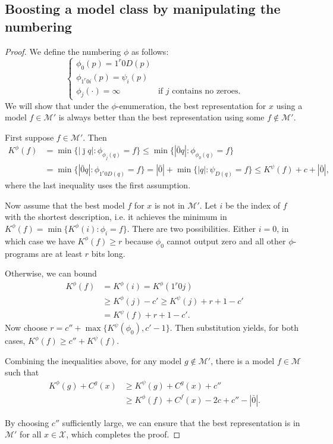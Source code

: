 \documentclass{style/llncs}
\newcommand{\M}{\mathscr M}
\newcommand{\X}{\mathscr X}
\begin{document}
\subsection{Boosting a model class by manipulating the numbering}

\coolone*

\begin{proof}
We define the numbering $\phi$ as follows:
\[\begin{cases}
\phi_0(p) = 1^r 0 D(p) \\
\phi_{1^r0i}(p) = \psi_i(p) \\
\phi_j(\cdot) = \infty &\text{if $j$ contains no zeroes.}
\end{cases}\]
We will show that under the $\phi$-enumeration, the best representation for $x$ using a model $f\in\M'$ is always better than the best representation using some $f\not\in\M'$.

First suppose $f\in\M'$. Then
\begin{align*}
K^\phi(f) &=\min\{|\bar\jmath q|:\phi_{\phi_j(q)}=f\}
\leq\min\{|\bar0 q|:\phi_{\phi_0(q)}=f\} \\ 
&=\min\{|\bar0 q|:\phi_{1^r0 D(q)}=f\}  
=|\bar 0|+\min\{|q|:\psi_{D(q)}=f\}
\leq K^\psi(f)+c+|\bar 0|,
\end{align*}
where the last inequality uses the first assumption.

Now assume that the best model $f$ for $x$ is not in $\M'$. 
Let $i$ be the index of $f$ with the shortest description, i.e. it achieves the minimum in $K^\phi(f)=\min\{K^\phi(i):\phi_i=f\}$.
There are two possibilities. Either $i=0$, in which case we have $K^\phi(f)\ge r$ because $\phi_0$ cannot output zero and all other $\phi$-programs are at least $r$ bits long.

Otherwise, we can bound
\begin{align*}
K^\phi(f)&=K^\phi(i)=K^\phi(1^r0j)\\
&\ge K^\phi(j)-c' \ge K^\psi(j)+r+1-c'\\
&=K^\psi(f)+r+1-c'.
\end{align*}
Now choose $r=c''+\max\{K^\psi(\phi_0),c'-1\}$. Then substitution yields, for both cases, 
$K^\phi(f)\ge c''+K^\psi(f)$.

Combining the inequalities above, for any model $g\not\in\M'$, there is a model $f\in\M$ such that
\[\begin{split}
K^\phi(g)+C^g(x) &\ge K^\psi(g)+C^g(x)+c''\\
&\ge K^\phi(f)+C^f(x) -2c+c'' -|\bar0|.
\end{split}\]

By choosing $c''$ sufficiently large, we can ensure that the best representation is in $\M'$ for all $x\in\X$, which completes the proof.
\end{proof}
\end{document}
